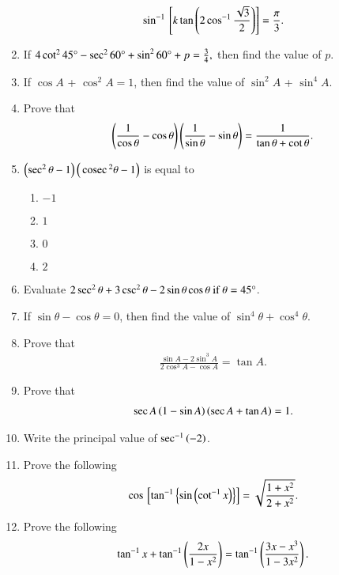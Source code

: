 \begin{enumerate}[label=\thesubsection.\arabic*,ref=\thesubsection.\theenumi,itemsep=1pt]
	\begin {align*}
	\sin^{-1} {}\left[k \tan \left( 2\cos^{-1} \frac {\sqrt{3}}{2}\right)\right]= \frac{\pi}{3}.
\end {align*}
\hfill{}
\item If $4 \cot^{2}45\degree-\sec^{2}60\degree+\sin^{2}60\degree+p=\frac{3}{4},$ then find the value of $p$.
\hfill{}\item If $\cos A$ + $\cos^{2}A = 1$, then find the value of $\sin^{2}A$ + $\sin^{4}A$.
\hfill{}
\item Prove that 
\begin{align*}
	\left(\frac{1}{\cos\theta}-\cos\theta\right) \left(\frac{1}{\sin\theta}-\sin\theta\right) = \frac{1}{\tan\theta + \cot\theta}
.\end{align*}
\hfill{}
\item $ \left(\sec^2 \theta - 1\right)\left(\,\text{cosec}\,^2 \theta - 1\right)$
is equal to
\begin{multicols}{4}
\begin{enumerate}
\item $-1$
\item $1$
\item $0$
\item $2$
\end{enumerate}
\end{multicols}
\hfill{}\item
Evaluate 
$2\sec^2\theta + 3\csc^2\theta - 2\sin\theta\cos\theta  \ \text{if} \ \theta = 45\degree
$.
\hfill{}\item 
If 
$\sin\theta - \cos\theta = 0$,  then find the value of $\sin^4\theta + \cos^4\theta$.
\hfill{}\item
Prove that \begin{align*} \frac{\sin{A}-2\sin^3{A}}{2\cos^3{A}-\cos{A}}=\tan{A} .\end{align*}
\hfill{}\item
Prove that \begin{align*} \sec{A\ensuremath{\left(1-\sin{A}\right)}\ensuremath{\left(\sec{A}+\tan{A}\right)}}=1. \end{align*}
\hfill{}
\item Write the principal value of $\sec^{-1} \left(-2\right)$.
\hfill{}\item Prove the following
    \begin{align*}
        \cos {}\left[\tan^{-1} \left\{\sin \left(\cot^{-1} x\right)\right\}\right] = \sqrt{\frac{1 + x^2}{2 + x^2}}.
    \end{align*}
\hfill{}\item Prove the following
    \begin{align*}
        \tan^{-1} x + \tan^{-1} \left(\frac{2x}{1 - x^2}\right) = \tan^{-1} \left(\frac{3x - x^3}{1 - 3x^2}\right).
    \end{align*}
\hfill{}
\end{enumerate}
